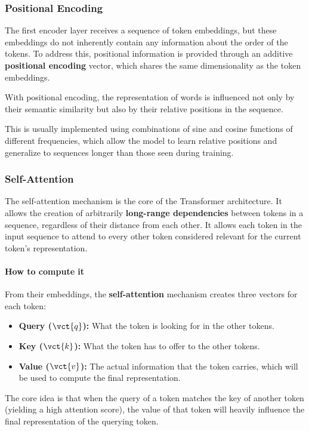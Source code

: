 \subsubsection{Positional Encoding}
The first encoder layer receives a sequence of token embeddings, but these embeddings do not inherently contain any information about the order of the tokens.
To address this, positional information is provided through an additive \textbf{positional encoding} vector, which shares the same dimensionality as the token embeddings. 

With positional encoding, the representation of words is influenced not only by their semantic similarity but also by their relative positions in the sequence.

This is usually implemented using combinations of sine and cosine functions of different frequencies, which allow the model to learn relative positions and generalize to sequences longer than those seen during training.

\subsubsection{Self-Attention}
The self-attention mechanism is the core of the Transformer architecture.
It allows the creation of arbitrarily \textbf{long-range dependencies} between tokens in a sequence, regardless of their distance from each other.
It allows each token in the input sequence to attend to every other token considered relevant for the current token's representation.

\paragraph{How to compute it}
From their embeddings, the \textbf{self-attention} mechanism creates three vectors for each token:
\begin{itemize}
    \item \textbf{Query (\(\vct{q}\)):} What the token is looking for in the other tokens.
    \item \textbf{Key (\(\vct{k}\)):} What the token has to offer to the other tokens.
    \item \textbf{Value (\(\vct{v}\)):} The actual information that the token carries, which will be used to compute the final representation.
\end{itemize}

The core idea is that when the query of a token matches the key of another token (yielding a high attention score), the value of that token will heavily influence the final representation of the querying token.

